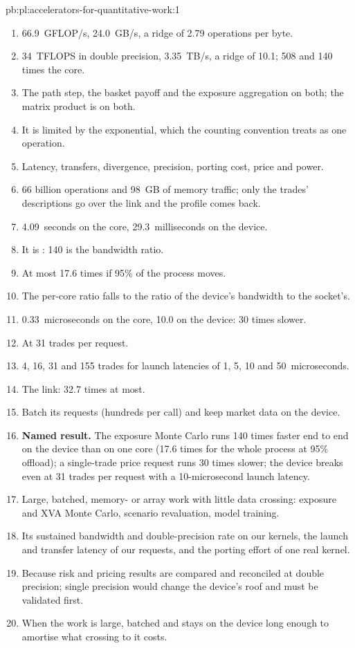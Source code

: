 \begin{solution}{pb:pl:accelerators-for-quantitative-work:1}
\begin{enumerate}
\item 66.9~GFLOP/s, 24.0~GB/s, a ridge of 2.79 operations per byte.
\item 34~TFLOPS in double precision, 3.35~TB/s, a ridge of 10.1; 508 and 140 times the core.
\item The path step, the basket payoff and the exposure aggregation on both; the matrix product is  on both.
\item It is limited by the exponential, which the counting convention treats as one operation.
\item Latency, transfers, divergence, precision, porting cost, price and power.
\item 66 billion operations and 98~GB of memory traffic; only the trades' descriptions go over the link and the profile comes back.
\item 4.09~seconds on the core, 29.3~milliseconds on the device.
\item It is : 140 is the bandwidth ratio.
\item At most 17.6 times if 95\% of the process moves.
\item The per-core ratio falls to the ratio of the device's bandwidth to the socket's.
\item 0.33~microseconds on the core, 10.0 on the device: 30 times slower.
\item At 31 trades per request.
\item 4, 16, 31 and 155 trades for launch latencies of 1, 5, 10 and 50~microseconds.
\item The link: 32.7 times at most.
\item Batch its requests (hundreds per call) and keep market data on the device.
\item \textbf{Named result.} The exposure Monte Carlo runs 140 times faster end to end on the device than on one core (17.6 times for the
whole process at 95\% offload); a single-trade price request runs 30 times slower; the device breaks even at 31 trades per request with a
10-microsecond launch latency.
\item Large, batched, memory- or  array work with little data crossing: exposure and XVA Monte Carlo, scenario revaluation,
model training.
\item Its sustained bandwidth and double-precision rate on our kernels, the launch and transfer latency of our requests, and the porting
effort of one real kernel.
\item Because risk and pricing results are compared and reconciled at double precision; single precision would change the device's roof and
must be validated first.
\item When the work is large, batched and stays on the device long enough to amortise what crossing to it costs.
\end{enumerate}
\end{solution}

